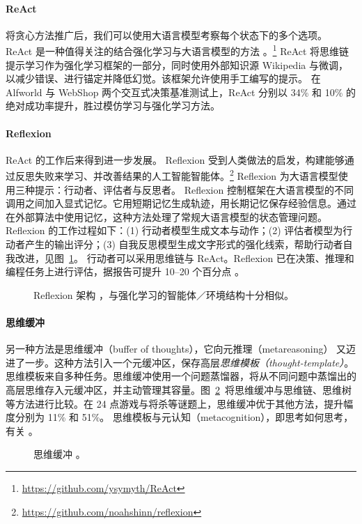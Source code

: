 \paragraph{ReAct}
将贪心方法推广后，我们可以使用大语言模型考察每个状态下的多个选项。
ReAct 是一种值得关注的结合强化学习与大语言模型的方法 \citep{yao2022react}。\footnote{\url{https://github.com/ysymyth/ReAct}}
ReAct 将思维链提示学习作为强化学习框架的一部分，同时使用外部知识源 Wikipedia 与微调，以减少错误、进行锚定并降低幻觉。该框架允许使用手工编写的提示。
在 Alfworld 与 WebShop 两个交互式决策基准测试上，ReAct 分别以 34\% 和 10\% 的绝对成功率提升，胜过模仿学习与强化学习方法。

\paragraph{Reflexion}
ReAct 的工作后来得到进一步发展。
Reflexion \citep{shinn2024reflexion} 受到人类做法的启发，构建能够通过反思失败来学习、并改善结果的人工智能智能体。\footnote{\url{https://github.com/noahshinn/reflexion}}
Reflexion 为大语言模型使用三种提示：行动者、评估者与反思者。
Reflexion 控制框架在大语言模型的不同调用之间加入显式记忆。它用短期记忆生成轨迹，用长期记忆保存经验信息。通过在外部算法中使用记忆，这种方法处理了常规大语言模型的状态管理问题。Reflexion 的工作过程如下：(1) 行动者模型生成文本与动作；(2) 评估者模型为行动者产生的输出评分；(3) 自我反思模型生成文字形式的强化线索，帮助行动者自我改进，见图~\ref{fig:reflexion2}。
行动者可以采用思维链与 ReAct。Reflexion 已在决策、推理和编程任务上进行评估，据报告可提升 10--20 个百分点 \citep{shinn2024reflexion}。
\begin{figure}
  \begin{center}
    
    \caption{Reflexion 架构 \citep{shinn2024reflexion}，与强化学习的智能体／环境结构十分相似。}\label{fig:reflexion2}
  \end{center}
\end{figure}

\paragraph{思维缓冲}
另一种方法是思维缓冲（buffer of thoughts）\citep{yang2024buffer}，它向元推理（metareasoning）\citep{gao2024meta} 又迈进了一步。这种方法引入一个元缓冲区，保存高层{\em 思维模板（thought-template）}。思维模板来自多种任务。思维缓冲使用一个问题蒸馏器，将从不同问题中蒸馏出的高层思维存入元缓冲区，并主动管理其容量。图~\ref{fig:bot2}~将思维缓冲与思维链、思维树等方法进行比较。在 24 点游戏与将杀等谜题上，思维缓冲优于其他方法，提升幅度分别为 11\% 和 51\%。
思维模板与元认知（metacognition），即思考如何思考，有关 \citep{didolkar2024metacognitive}。
 \begin{figure}
   \begin{center}
     
     \caption{思维缓冲 \citep{yang2024buffer}。}\label{fig:bot2}
   \end{center}
 \end{figure}

